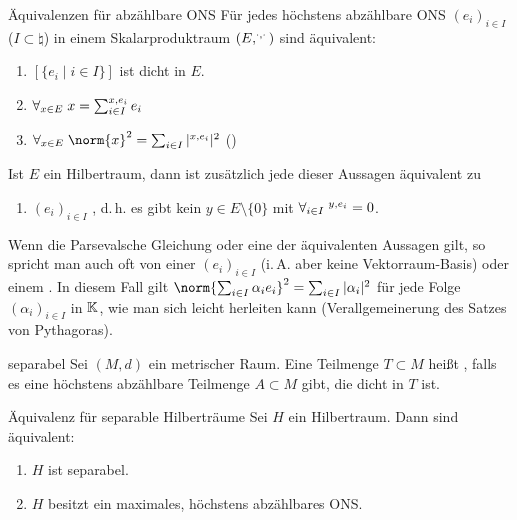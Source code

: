 \begin{Satz}{Äquivalenzen für abzählbare ONS}
    Für jedes höchstens abzählbare ONS $(e_i)_{i \in I}$ ($I \subset \natural$)
    in einem Skalarproduktraum $(E, \sp{\cdot, \cdot})$ sind äquivalent:
    \begin{enumerate}
        \item
        $[\{e_i \;|\; i \in I\}]$ ist dicht in $E$.

        \item
        $\forall_{x \in E}\; x = \sum_{i \in I} \sp{x, e_i} e_i$

        \item
        $\forall_{x \in E}\; \norm{x}^2 = \sum_{i \in I} |\sp{x, e_i}|^2$
        ()
    \end{enumerate}
    Ist $E$ ein Hilbertraum, dann ist zusätzlich jede dieser Aussagen äquivalent zu
    \begin{enumerate}[start=4]
        \item
        $(e_i)_{i \in I}$ , d.\,h. es gibt kein $y \in E \setminus \{0\}$ mit
        $\forall_{i \in I}\; \sp{y, e_i} = 0$.
    \end{enumerate}
\end{Satz}

\begin{Bem}
    Wenn die Parsevalsche Gleichung oder eine der äquivalenten Aussagen gilt,
    so spricht man auch oft von einer
     $(e_i)_{i \in I}$
    (i.\,A. aber keine Vektorraum-Basis)
    oder einem .
    In diesem Fall gilt
    $\norm{\sum_{i \in I} \alpha_i e_i}^2 = \sum_{i \in I} |\alpha_i|^2$
    für jede Folge $(\alpha_i)_{i \in I}$ in $\mathbb{K}$, wie man sich leicht herleiten kann
    (Verallgemeinerung des Satzes von Pythagoras).
\end{Bem}

\linie

\begin{Def}{separabel}
    Sei $(M, d)$ ein metrischer Raum.
    Eine Teilmenge $T \subset M$ heißt , falls es eine höchstens abzählbare
    Teilmenge $A \subset M$ gibt, die dicht in $T$ ist.
\end{Def}

\begin{Satz}{Äquivalenz für separable Hilberträume}
    Sei $H$ ein Hilbertraum. Dann sind äquivalent:
    \begin{enumerate}
        \item
        $H$ ist separabel.

        \item
        $H$ besitzt ein maximales, höchstens abzählbares ONS.
    \end{enumerate}
\end{Satz}

